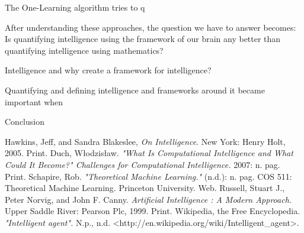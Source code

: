\documentclass[11pt, oneside]{article}
\begin{document}
\par The One-Learning algorithm tries to q

\par After understanding these approaches, the question we have to answer becomes: Is quantifying intelligence using the framework of our brain any better than quantifying intelligence using mathematics? 

\par Intelligence and why create a framework for intelligence?

\par Quantifying and defining intelligence and frameworks around it became important when


\par Conclusion

\begin{thebibliography}{9}
	Hawkins, Jeff, and Sandra Blakeslee,
	\emph{On Intelligence}.
	New York: Henry Holt, 2005.
	Print.
	Duch, W\l{}odzis\l{}aw.
	\emph{"What Is Computational Intelligence and What Could It Become?" Challenges for Computational Intelligence.}
	2007: n. pag. Print.
	Schapire, Rob. 
	\emph{"Theoretical Machine Learning."} 
	(n.d.): n. pag. COS 511: Theoretical Machine Learning. Princeton University. 
	Web.
	Russell, Stuart J., Peter Norvig, and John F. Canny. 
	\emph{Artificial Intelligence : A Modern Approach.}
	Upper Saddle River: Pearson Plc, 1999. Print.
	Wikipedia, the Free Encyclopedia. 
	\emph{"Intelligent agent".} 
	N.p., n.d. <http://en.wikipedia.org/wiki/Intelligent\_agent>.
\end{thebibliography}
\end{document}
